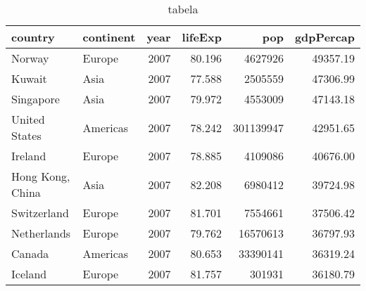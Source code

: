 \documentclass{article}\usepackage[]{graphicx}\usepackage[]{xcolor}
\begin{document}
\begin{table}[H]
    \centering
    \caption{tabela}
    
\begin{tabular}{l|l|r|r|r|r}
\hline
country & continent & year & lifeExp & pop & gdpPercap\\
\hline
Norway & Europe & 2007 & 80.196 & 4627926 & 49357.19\\
\hline
Kuwait & Asia & 2007 & 77.588 & 2505559 & 47306.99\\
\hline
Singapore & Asia & 2007 & 79.972 & 4553009 & 47143.18\\
\hline
United States & Americas & 2007 & 78.242 & 301139947 & 42951.65\\
\hline
Ireland & Europe & 2007 & 78.885 & 4109086 & 40676.00\\
\hline
Hong Kong, China & Asia & 2007 & 82.208 & 6980412 & 39724.98\\
\hline
Switzerland & Europe & 2007 & 81.701 & 7554661 & 37506.42\\
\hline
Netherlands & Europe & 2007 & 79.762 & 16570613 & 36797.93\\
\hline
Canada & Americas & 2007 & 80.653 & 33390141 & 36319.24\\
\hline
Iceland & Europe & 2007 & 81.757 & 301931 & 36180.79\\
\hline
\end{tabular}


\end{table}
\end{document}
